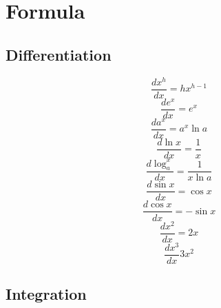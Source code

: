 \section{Formula}
	\subsection{Differentiation}
	
	\begin{equation}
	\frac{dx^h}{dx} = hx^{h-1}
	\end{equation}
	\begin{equation}
	\frac{de^x}{dx} = e^x
	\end{equation}
	\begin{equation}
	\frac{da^x}{dx} = a^x \ln a
	\end{equation}
	\begin{equation}
	\frac{d\ln x}{dx} = \frac{1}{x}
	\end{equation}
	\begin{equation}
	\frac{d\log_a^x}{dx} = \frac{1}{x\ln a}
	\end{equation}
	\begin{equation}
	\frac{d\sin x}{dx} = \cos x
	\end{equation}
	\begin{equation}
	\frac{d\cos x}{dx} = -\sin x
	\end{equation}
	\begin{equation}
	\frac{dx^2}{dx} = 2x
	\end{equation}
	\begin{equation}
	\frac{dx^3}{dx} 3x^2
	\end{equation}
	
	\subsection{Integration}
	
